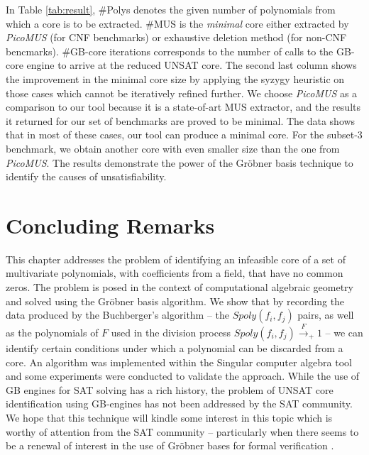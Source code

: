 In Table \ref{tab:result}, 
\#Polys denotes the given number of polynomials
from which a core is to be extracted. \#MUS is the {\it minimal} core either
extracted by {\it PicoMUS} (for CNF benchmarks) or exhaustive deletion method (for non-CNF bencmarks).
 \#GB-core iterations corresponds to the
number of calls to the GB-core engine to arrive at the reduced UNSAT
core. The second last column shows the improvement in the minimal core
size by applying the syzygy heuristic on those cases which cannot be
iteratively refined further. 
We choose {\it PicoMUS} as a comparison to our tool because it is a state-of-art MUS extractor,
and the results it returned for our set of benchmarks are proved to be minimal. 
The data shows that in most of these
cases, our tool can produce a minimal core. For the subset-3
benchmark, we obtain another core with even smaller size than the one from {\it PicoMUS}. The results
demonstrate the power of the Gr\"obner basis technique to identify the
causes of unsatisfiability. 



\section{Concluding Remarks}\label{sec:conc}
This chapter addresses the problem of identifying an infeasible core of
a set of multivariate polynomials, with coefficients from a field,
that have no common zeros. The problem is posed in the context of
computational algebraic geometry and solved using the Gr\"obner basis
algorithm. We show that by recording the data produced by the
Buchberger's algorithm -- the $Spoly(f_i,f_j)$ pairs, as well as the
polynomials of $F$ used in the division process
$Spoly(f_i,f_j)\xrightarrow{F}_+ 1$ -- we can identify certain
conditions under which a polynomial can be discarded from a core. An
algorithm was implemented within the Singular computer algebra tool
and some experiments were conducted to validate the approach. While
the use of GB engines for SAT solving has a rich history, the problem
of UNSAT core identification using GB-engines has not been addressed
by the SAT community. We hope that this technique will kindle some
interest in this topic which is worthy of attention from the SAT
community -- particularly when there seems to be a renewal of interest
in the use of Gr\"obner bases for formal verification
\cite{lv:tcad2013,gao:qe-gf-gb,kalla:fmcad_tut2015,rolf:date16}.    
